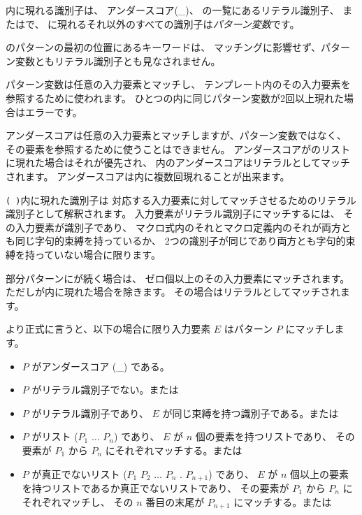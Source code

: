 \begin{entry}
内に現れる識別子は、
アンダースコア({\cf \_})、
の一覧にあるリテラル識別子、
またはで、
に現れるそれ以外のすべての識別子は{\em パターン変数}です。

のパターンの最初の位置にあるキーワードは、
マッチングに影響せず、パターン変数ともリテラル識別子とも見なされません。

パターン変数は任意の入力要素とマッチし、
テンプレート内のその入力要素を参照するために使われます。
ひとつの内に同じパターン変数が2回以上現れた場合はエラーです。

アンダースコアは任意の入力要素とマッチしますが、パターン変数ではなく、
その要素を参照するために使うことはできません。
アンダースコアがのリストに現れた場合はそれが優先され、
内のアンダースコアはリテラルとしてマッチされます。
アンダースコアは内に複数回現れることが出来ます。

\texttt{( \dotsfoo)}内に現れた識別子は
対応する入力要素に対してマッチさせるためのリテラル識別子として解釈されます。
入力要素がリテラル識別子にマッチするには、
その入力要素が識別子であり、
マクロ式内のそれとマクロ定義内のそれが両方とも同じ字句的束縛を持っているか、
2つの識別子が同じであり両方とも字句的束縛を持っていない場合に限ります。

部分パターンにが続く場合は、
ゼロ個以上のその入力要素にマッチされます。
ただしが内に現れた場合を除きます。
その場合はリテラルとしてマッチされます。

より正式に言うと、以下の場合に限り入力要素 $E$ はパターン $P$ にマッチします。

\begin{itemize}
\item $P$ がアンダースコア ({\cf \_}) である。

\item $P$ がリテラル識別子でない。または

\item $P$ がリテラル識別子であり、 $E$ が同じ束縛を持つ識別子である。または

\item $P$ がリスト {\cf ($P_1$ $\dots$ $P_n$)} であり、 $E$ が $n$ 個の要素を持つリストであり、
      その要素が $P_1$ から $P_n$ にそれぞれマッチする。または

\item $P$ が真正でないリスト
      {\cf ($P_1$ $P_2$ $\dots$ $P_n$ . $P_{n+1}$)}
      であり、 $E$ が $n$ 個以上の要素を持つリストであるか真正でないリストであり、
      その要素が $P_1$ から $P_n$ にそれぞれマッチし、
      その $n$ 番目の末尾が $P_{n+1}$ にマッチする。または


\end{itemize}
\end{entry}
